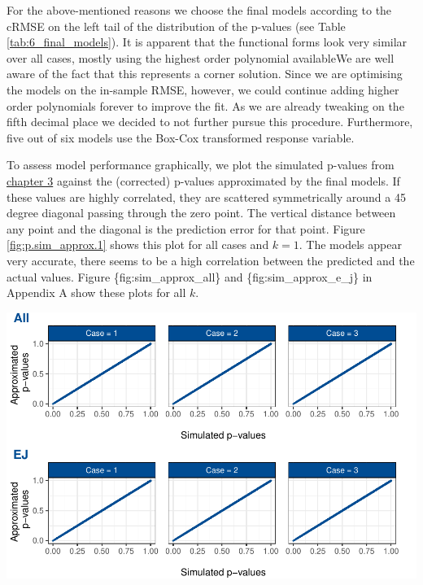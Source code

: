 \documentclass[12pt,a4paper]{article}
\let\origfigure\figure
\let\endorigfigure\endfigure
\renewenvironment{figure}[1][2] {
    \expandafter\origfigure\expandafter[H]
} {
    \endorigfigure
}
\begin{document}
For the above-mentioned reasons we choose the final models according to
the cRMSE on the left tail of the distribution of the p-values (see
Table \ref{tab:6_final_models}). It is apparent that the functional
forms look very similar over all cases, mostly using the highest order
polynomial availableWe are well aware of the fact that this represents a
corner solution. Since we are optimising the models on the in-sample
RMSE, however, we could continue adding higher order polynomials forever
to improve the fit. As we are already tweaking on the fifth decimal
place we decided to not further pursue this procedure. Furthermore, five
out of six models use the Box-Cox transformed response variable.

To assess model performance graphically, we plot the simulated p-values
from \protect\hyperlink{simulation}{chapter 3} against the (corrected)
p-values approximated by the final models. If these values are highly
correlated, they are scattered symmetrically around a 45 degree diagonal
passing through the zero point. The vertical distance between any point
and the diagonal is the prediction error for that point. Figure
\ref{fig:p.sim_approx.1} shows this plot for all cases and \(k = 1\).
The models appear very accurate, there seems to be a high correlation
between the predicted and the actual values. Figure
\{fig:sim\_approx\_all\} and \{fig:sim\_approx\_e\_j\} in Appendix A
show these plots for all \(k\).

\begin{figure}
\centering
\includegraphics{p_approx_paper_files/figure-latex/p.sim_aprox.k1-1.pdf}
\caption{\label{fig:p.sim_approx.1} Simulated p-values plotted against
p-values approximated by final (corrected) models, exemplary for
\(k = 1\).}
\end{figure}
\end{document}
